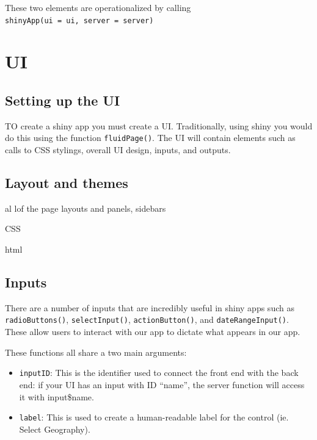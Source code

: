 \documentclass[
]{book}
\providecommand{\tightlist}{%
  \setlength{\itemsep}{0pt}\setlength{\parskip}{0pt}}
\begin{document}
These two elements are operationalized by calling \texttt{shinyApp(ui\ =\ ui,\ server\ =\ server)}

\hypertarget{ui}{%
\section{UI}\label{ui}}

\hypertarget{setting-up-the-ui}{%
\subsection{Setting up the UI}\label{setting-up-the-ui}}

TO create a shiny app you must create a UI. Traditionally, using shiny you would do this using the function \texttt{fluidPage()}. The UI will contain elements such as calls to CSS stylings, overall UI design, inputs, and outputs.

\hypertarget{layout-and-themes}{%
\subsection{Layout and themes}\label{layout-and-themes}}

al lof the page layouts and panels, sidebars

CSS

html

\hypertarget{inputs}{%
\subsection{Inputs}\label{inputs}}

There are a number of inputs that are incredibly useful in shiny apps such as \texttt{radioButtons()}, \texttt{selectInput()}, \texttt{actionButton()}, and \texttt{dateRangeInput()}. These allow users to interact with our app to dictate what appears in our app.

These functions all share a two main arguments:

\begin{itemize}
\tightlist
\item
  \texttt{inputID}: This is the identifier used to connect the front end with the back end: if your UI has an input with ID ``name'', the server function will access it with input\$name.\\
\item
  \texttt{label}: This is used to create a human-readable label for the control (ie. Select Geography).
\end{itemize}
\end{document}
